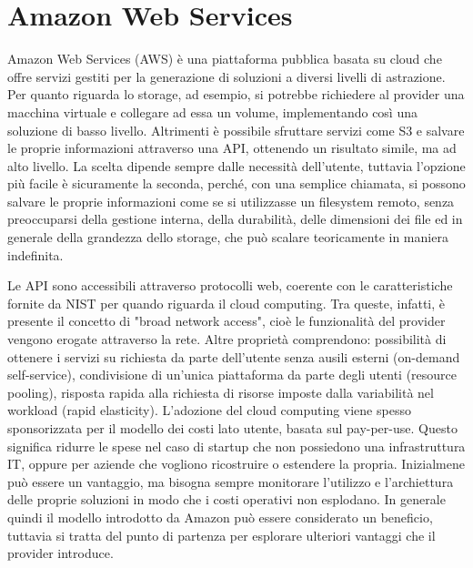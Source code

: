 \section{Amazon Web Services}
Amazon Web Services (AWS) è una piattaforma pubblica basata su cloud che offre servizi gestiti per la generazione di soluzioni a diversi livelli di astrazione. Per quanto riguarda lo storage, ad esempio, si potrebbe richiedere al provider una macchina virtuale e collegare ad essa un volume, implementando così una soluzione di basso livello. Altrimenti è possibile sfruttare servizi come S3 e salvare le proprie informazioni attraverso una API, ottenendo un risultato simile, ma ad alto livello. La scelta dipende sempre dalle necessità dell'utente, tuttavia l'opzione più facile è sicuramente la seconda, perché, con una semplice chiamata, si possono salvare le proprie informazioni come se si utilizzasse un filesystem remoto, senza preoccuparsi della gestione interna, della durabilità, delle dimensioni dei file ed in generale della grandezza dello storage, che può scalare teoricamente in maniera indefinita. %

Le API sono accessibili attraverso protocolli web, coerente con le caratteristiche fornite da NIST per quando riguarda il cloud computing. Tra queste, infatti, è presente il concetto di "broad network access", cioè le funzionalità del provider vengono erogate attraverso la rete. Altre proprietà comprendono: possibilità di ottenere i servizi su richiesta da parte dell'utente senza ausili esterni (on-demand self-service), condivisione di un'unica piattaforma da parte degli utenti (resource pooling), risposta rapida alla richiesta di risorse imposte dalla variabilità nel workload (rapid elasticity).  
L'adozione del cloud computing viene spesso sponsorizzata per il modello dei costi lato utente, basata sul pay-per-use. Questo significa ridurre le spese nel caso di startup che non possiedono una infrastruttura IT, oppure per aziende che vogliono ricostruire o estendere la propria. Inizialmene può essere un vantaggio, ma bisogna sempre monitorare l'utilizzo e l'archiettura delle proprie soluzioni in modo che i costi operativi non esplodano. In generale quindi il modello introdotto da Amazon può essere considerato un beneficio, tuttavia si tratta del punto di partenza per esplorare ulteriori vantaggi che il provider introduce. 

